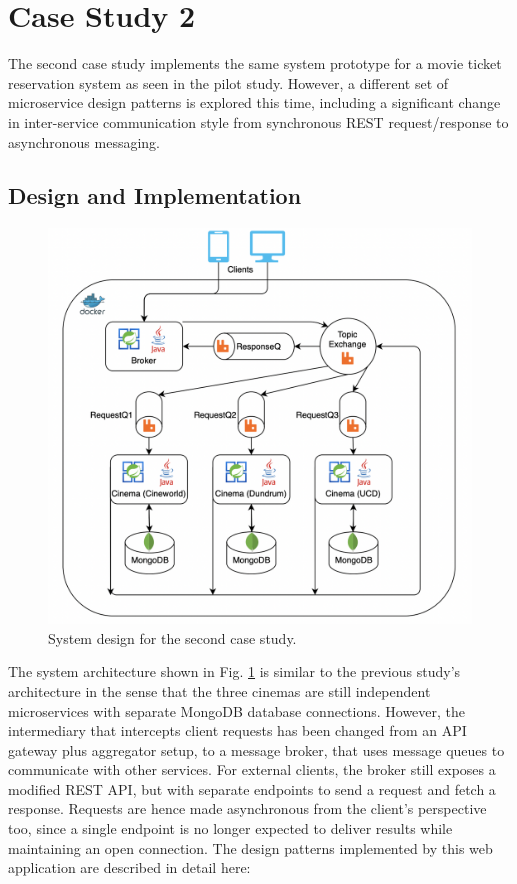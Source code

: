 \section{Case Study 2}

The second case study implements the same system prototype for a movie ticket reservation system as seen in the pilot study. However, a different set of microservice design patterns is explored this time, including a significant change in inter-service communication style from synchronous REST request/response to asynchronous messaging.

\subsection{Design and Implementation}

\begin{figure}[H]
	\centering
	\includegraphics[width=0.6\linewidth]{./assets/diagrams/cs02-arch.png}
	\caption{System design for the second case study.}
	\label{fig:cs02-arch}
\end{figure}

The system architecture shown in Fig. \ref{fig:cs02-arch} is similar to the previous study's architecture in the sense that the three cinemas are still independent microservices with separate MongoDB database connections. However, the intermediary that intercepts client requests has been changed from an API gateway plus aggregator setup, to a message broker, that uses message queues to communicate with other services. For external clients, the broker still exposes a modified REST API, but with separate endpoints to send a request and fetch a response. Requests are hence made asynchronous from the client's perspective too, since a single endpoint is no longer expected to deliver results while maintaining an open connection. The design patterns implemented by this web application are described in detail here:


